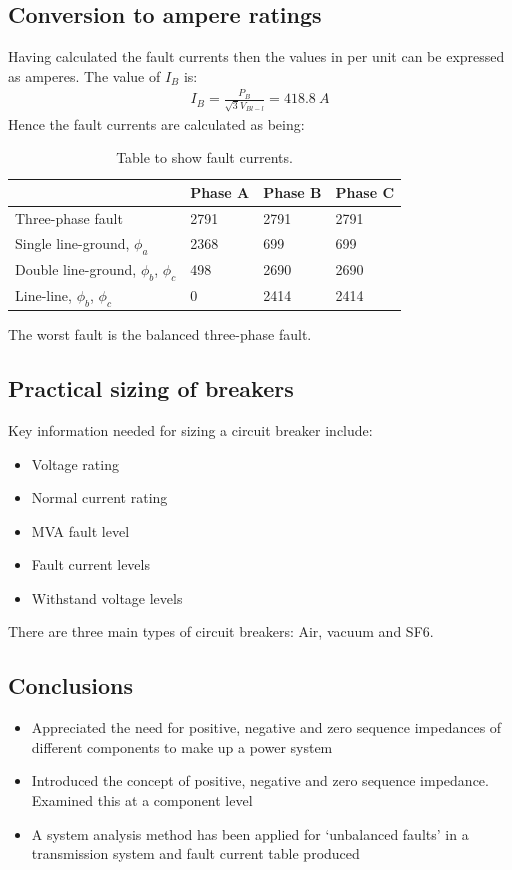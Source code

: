 \subsection{Conversion to ampere ratings}
Having calculated the fault currents then the values in per unit can be expressed as amperes. The value of $I_B$ is:
\begin{gather}
	I_B = \frac{P_B}{\sqrt{3}V_{Bl-l}} = \SI{418.8}{A}
\end{gather}
Hence the fault currents are calculated as being:
\begin{table}
	\centering
	\begin{tabular}{@{}llll@{}}
		\toprule
		                                       & Phase A & Phase B & Phase C \\
		\midrule
		Three-phase fault                      & 2791    & 2791    & 2791    \\
		Single line-ground, $\phi_a$           & 2368    & 699     & 699     \\
		Double line-ground, $\phi_b$, $\phi_c$ & 498     & 2690    & 2690    \\
		Line-line, $\phi_b$, $\phi_c$          & 0       & 2414    & 2414    \\
		\bottomrule
	\end{tabular}
	\caption{Table to show fault currents.}
\end{table}
The worst fault is the balanced three-phase fault.
\subsection{Practical sizing of breakers}
Key information needed for sizing a circuit breaker include:
\begin{itemize}
	\item Voltage rating
	\item Normal current rating
	\item MVA fault level
	\item Fault current levels
	\item Withstand voltage levels
\end{itemize}
There are three main types of circuit breakers: Air, vacuum and SF6.
\subsection{Conclusions}
\begin{itemize}
	\item Appreciated the need for positive, negative and zero sequence impedances of different components to make up a power system
	\item Introduced the concept of positive, negative and zero sequence impedance. Examined this at a component level
	\item A system analysis method has been applied for `unbalanced faults' in a transmission system and fault current table produced
\end{itemize}
